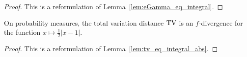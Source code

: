 \begin{proof}%
{}
This is a reformulation of Lemma~\ref{lem:eGamma_eq_integral}.
\end{proof}

\begin{lemma}
  \label{lem:tv_eq_fDiv}
  On probability measures, the total variation distance $\operatorname{TV}$ is an $f$-divergence for the function $x \mapsto \frac{1}{2}\vert x - 1 \vert$.
\end{lemma}

\begin{proof}%
{}
This is a reformulation of Lemma~\ref{lem:tv_eq_integral_abs}.
\end{proof}